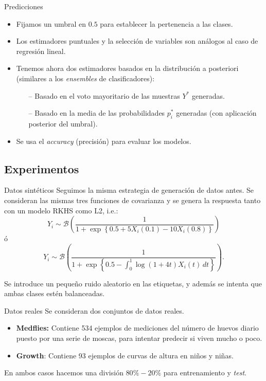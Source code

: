 \documentclass[10pt, spanish, professionalfonts]{beamer}
\begin{document}
\begin{frame}{Predicciones}

\begin{itemize}
  \item Fijamos un umbral en \(0.5\) para establecer la pertenencia a las clases.
   \item Los estimadores puntuales y la selección de variables son análogos al caso de regresión lineal.
   \item Tenemos ahora dos estimadores basados en la distribución a posteriori (similares a los \textit{ensembles} de clasificadores):
   \begin{itemize}
     \item[--] Basado en el voto mayoritario de las muestras \(Y^*\) generadas.
     \item[--] Basado en la media de las probabilidades \(p_i^*\) generadas (con aplicación posterior del umbral).
   \end{itemize}
  \item Se usa el \textit{accuracy} (precisión) para evaluar los modelos.
\end{itemize}
\end{frame}

\subsection{Experimentos}

\begin{frame}{Datos sintéticos}
Seguimos la misma estrategia de generación de datos antes. Se consideran las mismas tres funciones de covarianza y se genera la respuesta tanto con un modelo RKHS como L2, i.e.:
  \[
    Y_i \sim \mathcal B\left(\frac{1}{1 + \exp\left\{0.5 + 5X_i(0.1) - 10X_i(0.8)\right\}}\right)
  \]
  ó
  \[
    Y_i \sim \mathcal B\left(\frac{1}{1 + \exp\left\{0.5 -\int_0^1 \log(1+4t)X_i(t)\, dt\right\}}\right).
  \]

  \vspace{1em}

  Se introduce un pequeño ruido aleatorio en las etiquetas, y además se intenta que ambas clases estén balanceadas.

\end{frame}

\begin{frame}{Datos reales}
  Se consideran dos conjuntos de datos reales.
  \begin{itemize}
    \item \textbf{Medflies:} Contiene 534 ejemplos de mediciones del número de huevos diario puesto por una serie de moscas, para intentar predecir si viven mucho o poco.
    \item \textbf{Growth}: Contiene 93 ejemplos de curvas de altura en niños y niñas.
  \end{itemize}

  En ambos casos hacemos una división \(80\%-20\%\) para entrenamiento y \textit{test}.
\end{frame}
\end{document}
